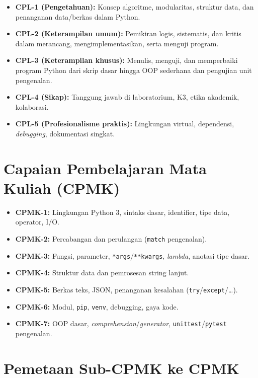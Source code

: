 \documentclass[../main.tex]{subfiles}
\begin{document}
\begin{itemize}[leftmargin=*]
  \item \textbf{CPL-1 (Pengetahuan):} Konsep algoritme, modularitas, struktur data, dan penanganan data/berkas dalam Python.
  \item \textbf{CPL-2 (Keterampilan umum):} Pemikiran logis, sistematis, dan kritis dalam merancang, mengimplementasikan, serta menguji program.
  \item \textbf{CPL-3 (Keterampilan khusus):} Menulis, menguji, dan memperbaiki program Python dari skrip dasar hingga OOP sederhana dan pengujian unit pengenalan.
  \item \textbf{CPL-4 (Sikap):} Tanggung jawab di laboratorium, K3, etika akademik, kolaborasi.
  \item \textbf{CPL-5 (Profesionalisme praktis):} Lingkungan virtual, dependensi, \textit{debugging}, dokumentasi singkat.
\end{itemize}

\section{Capaian Pembelajaran Mata Kuliah (CPMK)}

\begin{itemize}[leftmargin=*]
  \item \textbf{CPMK-1:} Lingkungan Python 3, sintaks dasar, identifier, tipe data, operator, I/O.
  \item \textbf{CPMK-2:} Percabangan dan perulangan (\texttt{match} pengenalan).
  \item \textbf{CPMK-3:} Fungsi, parameter, \texttt{*args}/\texttt{**kwargs}, \textit{lambda}, anotasi tipe dasar.
  \item \textbf{CPMK-4:} Struktur data dan pemrosesan string lanjut.
  \item \textbf{CPMK-5:} Berkas teks, JSON, penanganan kesalahan (\texttt{try}/\texttt{except}/\ldots).
  \item \textbf{CPMK-6:} Modul, \texttt{pip}, \texttt{venv}, debugging, gaya kode.
  \item \textbf{CPMK-7:} OOP dasar, \textit{comprehension}/\textit{generator}, \texttt{unittest}/\texttt{pytest} pengenalan.
\end{itemize}

\section{Pemetaan Sub-CPMK ke CPMK}
\end{document}
